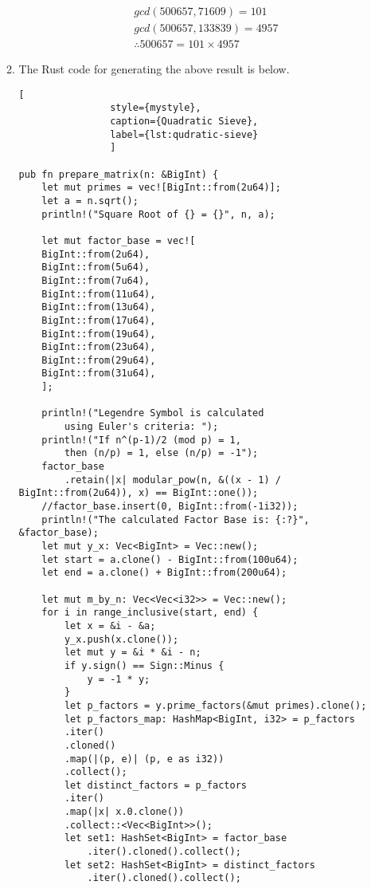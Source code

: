 \documentclass[11pt,a4paper,fleqn]{article}
\newcommand{\qed}{\tag*{$\blacksquare$}}
\begin{document}
\begin{enumerate}[1.]
\begin{flushleft}
\begin{enumerate}[Step 1.]
\begin{align*}
                    & gcd(500657, 71609) = 101 \\
                    & gcd(500657, 133839) = 4957\\\
                    &   \therefore 500657 = 101 \times 4957
                    \qed
                \end{align*}
                \item The Rust code for generating the above result is below.
                \begin{lstlisting}[
                style={mystyle},
                caption={Quadratic Sieve},
                label={lst:qudratic-sieve}
                ]

pub fn prepare_matrix(n: &BigInt) {
    let mut primes = vec![BigInt::from(2u64)];
    let a = n.sqrt();
    println!("Square Root of {} = {}", n, a);

    let mut factor_base = vec![
    BigInt::from(2u64),
    BigInt::from(5u64),
    BigInt::from(7u64),
    BigInt::from(11u64),
    BigInt::from(13u64),
    BigInt::from(17u64),
    BigInt::from(19u64),
    BigInt::from(23u64),
    BigInt::from(29u64),
    BigInt::from(31u64),
    ];

    println!("Legendre Symbol is calculated
        using Euler's criteria: ");
    println!("If n^(p-1)/2 (mod p) = 1,
        then (n/p) = 1, else (n/p) = -1");
    factor_base
        .retain(|x| modular_pow(n, &((x - 1) / BigInt::from(2u64)), x) == BigInt::one());
    //factor_base.insert(0, BigInt::from(-1i32));
    println!("The calculated Factor Base is: {:?}", &factor_base);
    let mut y_x: Vec<BigInt> = Vec::new();
    let start = a.clone() - BigInt::from(100u64);
    let end = a.clone() + BigInt::from(200u64);

    let mut m_by_n: Vec<Vec<i32>> = Vec::new();
    for i in range_inclusive(start, end) {
        let x = &i - &a;
        y_x.push(x.clone());
        let mut y = &i * &i - n;
        if y.sign() == Sign::Minus {
            y = -1 * y;
        }
        let p_factors = y.prime_factors(&mut primes).clone();
        let p_factors_map: HashMap<BigInt, i32> = p_factors
        .iter()
        .cloned()
        .map(|(p, e)| (p, e as i32))
        .collect();
        let distinct_factors = p_factors
        .iter()
        .map(|x| x.0.clone())
        .collect::<Vec<BigInt>>();
        let set1: HashSet<BigInt> = factor_base
            .iter().cloned().collect();
        let set2: HashSet<BigInt> = distinct_factors
            .iter().cloned().collect();


\end{lstlisting}
\end{enumerate}
\end{flushleft}
\end{enumerate}
\end{document}

